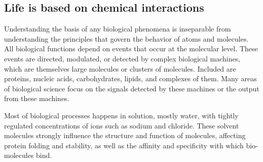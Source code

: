 \subsection{Life is based on chemical interactions}

Understanding the basis of any biological phenomena is inseparable from understanding the principles that govern the behavior of atoms and molecules. All biological functions depend on events that occur at the molecular level. These events are directed, modulated, or detected by complex biological machines, which are themselves large molecules or clusters of molecules. Included are proteins, nucleic acids, carbohydrates, lipids, and complexes of them. Many areas of biological science focus on the signals detected by these machines or the output from these machines.

Most of biological processes happens in solution, mostly water, with tightly regulated concentrations of ions such as sodium and chloride. These solvent molecules strongly influence the structure and function of molecules, affecting protein folding and stability, as well as the affinity and specificity with which bio-molecules bind.

\par







